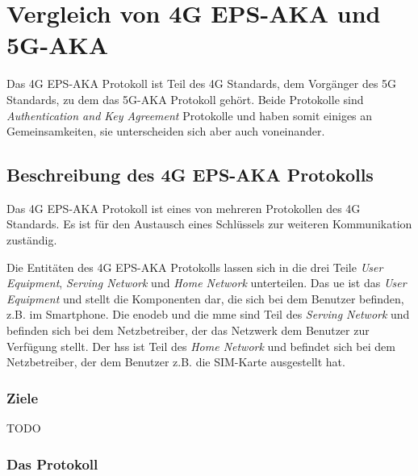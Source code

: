 \chapter{Vergleich von 4G EPS-AKA und 5G-AKA}
\label{chap:3}

Das 4G EPS-AKA Protokoll ist Teil des 4G Standards, dem Vorgänger des 5G Standards, zu dem das 5G-AKA Protokoll gehört.
Beide Protokolle sind \textit{Authentication and Key Agreement} Protokolle und haben somit einiges an Gemeinsamkeiten, sie unterscheiden sich aber auch voneinander.

\section{Beschreibung des 4G EPS-AKA Protokolls}

Das 4G EPS-AKA Protokoll ist eines von mehreren Protokollen des 4G Standards.
Es ist für den Austausch eines Schlüssels zur weiteren Kommunikation zuständig.

Die Entitäten des 4G EPS-AKA Protokolls lassen sich in die drei Teile \textit{User Equipment}, \textit{Serving Network} und \textit{Home Network} unterteilen.
Das \gls{ue} ist das \textit{User Equipment} und stellt die Komponenten dar, die sich bei dem Benutzer befinden, z.B. im Smartphone.
Die \gls{enodeb} und die \gls{mme} sind Teil des \textit{Serving Network} und befinden sich bei dem Netzbetreiber, der das Netzwerk dem Benutzer zur Verfügung stellt.
Der \gls{hss} ist Teil des \textit{Home Network} und befindet sich bei dem Netzbetreiber, der dem Benutzer z.B. die SIM-Karte ausgestellt hat. %

\subsection{Ziele}

TODO

\subsection{Das Protokoll}

